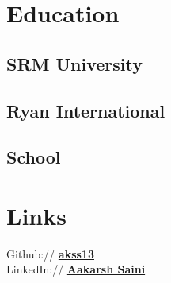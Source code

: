 \documentclass[]{deedy-resume-openfont}
\begin{document}
\begin{minipage}[t][18cm]{0.33\textwidth} 


\section{Education} 

\subsection{SRM University}
\sectionsep

\subsection{Ryan International}
\subsection{School}
\sectionsep


\section{Links} 
Github:// \href{https://github.com/akss13}{\bf akss13} \\
LinkedIn://  \href{https://www.linkedin.com/in/aakarsh-saini-609a86178/}{\bf Aakarsh Saini} \\




\end{minipage}
\end{document}
